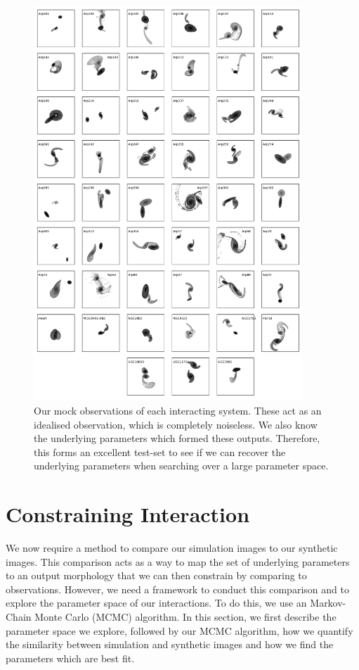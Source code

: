 \begin{figure}
    \centering
    \includegraphics[width=0.90\textwidth]{Chapter1/figures/mock-images.pdf}
    \caption[Our mock observations of each interacting system.]{Our mock observations of each interacting system. These act as an idealised observation, which is completely noiseless. We also know the underlying parameters which formed these outputs. Therefore, this forms an excellent test-set to see if we can recover the underlying parameters when searching over a large parameter space.}
    \label{fig:Obj_Cutout}
\end{figure}

\section{Constraining Interaction}\label{method:constraint}
We now require a method to compare our simulation images to our synthetic images. This comparison acts as a way to map the set of underlying parameters to an output morphology that we can then constrain by comparing to observations. However, we need a framework to conduct this comparison and to explore the parameter space of our interactions. To do this, we use an Markov-Chain Monte Carlo (MCMC) algorithm. In this section, we first describe the parameter space we explore, followed by our MCMC algorithm, how we quantify the similarity between simulation and synthetic images and how we find the parameters which are best fit.

